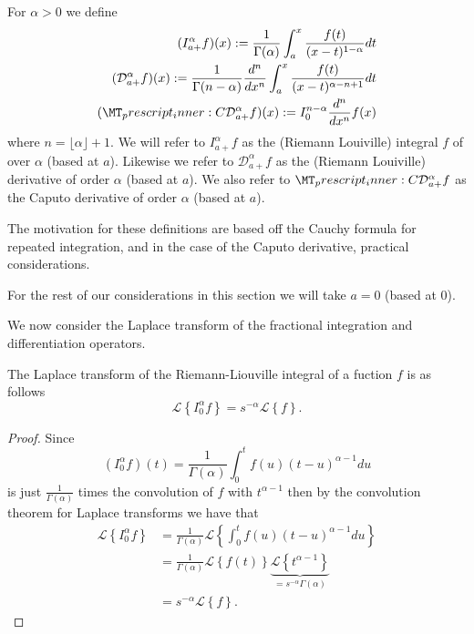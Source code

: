 \documentclass{unswmaths}
\begin{document}
\begin{definition}
	For $ \alpha > 0 $ we define
	\begin{align*}
		(I_{a+}^{\alpha}f)(x) := \frac{1}{\Gamma(\alpha)}\int_a^x \frac{f(t)}{(x-t)^{1 - \alpha}} dt \\
		(\mathcal{D}_{a+}^{\alpha}f)(x) := \frac{1}{\Gamma(n-\alpha)} \frac{d^n}{dx^n}\int_a^x \frac{f(t)}{(x-t)^{\alpha - n + 1}} dt \\
		(\prescript{C}{}{\mathcal{D}}_{a+}^\alpha f)(x) := I_{0}^{n-\alpha} \frac{d^n}{dx^n}f(x) 
	\end{align*}
	where $ n  = \lfloor \alpha \rfloor + 1$.
	We will refer to $ I_{a+}^\alpha f$ as the (Riemann Louiville) integral $ f $ of over $ \alpha $ (based at $ a $).
	Likewise we refer to $ \mathcal{D}_{a+}^\alpha f $ as the (Riemann Louiville) derivative of order $ \alpha $ (based at $ a $).
	We also refer to $ \prescript{C}{}{\mathcal{D}}_{a+}^\alpha f $ as the Caputo derivative of order $ \alpha $ (based at $ a $).
	
\end{definition}

The motivation for these definitions are based off the Cauchy formula for repeated integration, and in the case
of the Caputo derivative, practical considerations. \cite{Samko1993, Podlubny1999} 

For the rest of our considerations in this section we will take $ a = 0 $ (based at 0). 

We now consider the Laplace transform of the fractional integration and differentiation operators.

\begin{lemma}
\label{lem:lap_rli}
	The Laplace transform of the Riemann-Liouville integral of a fuction $ f $ is as follows
	$$
		\mathcal{L} \left\{ I_0^\alpha f \right\}  = s^{-\alpha} \mathcal{L} \left\{ f \right\}.
	$$
\end{lemma}
\begin{proof}
	Since 
	$$
		 (I_0^\alpha f)(t) = \frac{1}{\Gamma(\alpha)} \int_0^t f(u) (t-u)^{\alpha - 1} du
	$$
	is just $ \frac{1}{\Gamma(\alpha)} $ times the convolution of $ f $ with $ t^{\alpha - 1} $ then by the convolution theorem
	for Laplace transforms we have that 
	\begin{align*}
		\mathcal{L} \left\{ I_0^\alpha f \right\} &= \frac{1}{\Gamma(\alpha)} \mathcal{L} \left\{ \int_{0}^{t} f(u) (t-u)^{\alpha - 1} du \right\} \\
			&= \frac{1}{\Gamma(\alpha)} \mathcal{L} \left\{ f(t) \right\} \underbrace{\mathcal{L} \left\{ t^{\alpha - 1} \right\}}_{=s^{-\alpha} \Gamma(\alpha)} \\
			&= s^{-\alpha} \mathcal{L} \left\{ f \right\}.
	\end{align*}
\end{proof}
\end{document}
